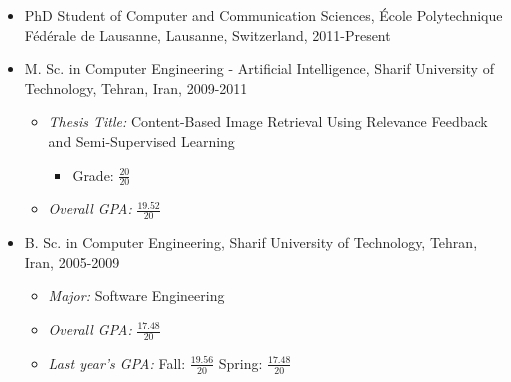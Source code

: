 \documentclass[a4paper]{article}
\theoremstyle{definition}
\begin{document}
\begin{itemize}

\item PhD Student of Computer and Communication Sciences, \'{E}cole Polytechnique F\'{e}d\'{e}rale de Lausanne, Lausanne, Switzerland, 2011-Present 

%


\item M. Sc. in Computer Engineering - Artificial Intelligence, Sharif University of Technology, Tehran, Iran, 2009-2011 

\begin{itemize}
\item \emph{Thesis Title:} Content-Based Image Retrieval Using Relevance Feedback and Semi-Supervised Learning 
	\begin{itemize}
		\item Grade: $\frac{20}{20}$
	\end{itemize}

\item \emph{Overall GPA:} $\frac{19.52}{20}$
\end{itemize}

\item B. Sc. in Computer Engineering, Sharif University of Technology, Tehran, Iran, 2005-2009 

\begin{itemize}
\item \emph{Major:} Software Engineering
\item \emph{Overall GPA:} $\frac{17.48}{20}$
\item \emph{Last year's GPA:} Fall: $\frac{19.56}{20}$ Spring: $\frac{17.48}{20}$
\end{itemize}

\end{itemize}
\end{document}
